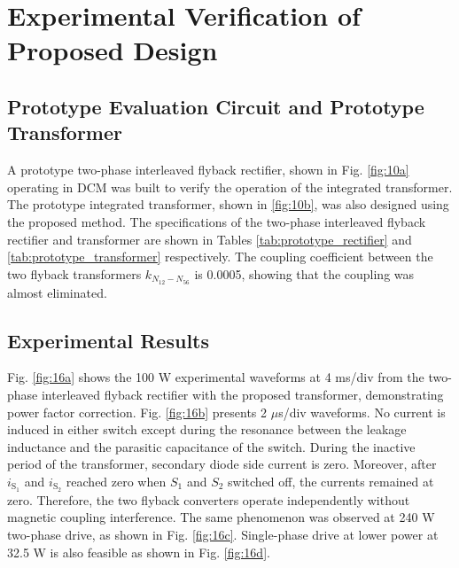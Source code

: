 \documentclass[lettersize,journal]{IEEEtran}
\begin{document}
\section{Experimental Verification of Proposed Design}

\subsection{Prototype Evaluation Circuit and Prototype Transformer}
A prototype two-phase interleaved flyback rectifier, shown in Fig. \ref{fig:10a} operating in DCM was built to verify the operation of the integrated transformer. The prototype integrated transformer, shown in \ref{fig:10b}, was also designed using the proposed method. The specifications of the two-phase interleaved flyback rectifier and transformer are shown in Tables \ref{tab:prototype_rectifier} and \ref{tab:prototype_transformer} respectively. The coupling coefficient between the two flyback transformers $k_{N_{12}-N_{56}}$ is 0.0005, showing that the coupling was almost eliminated.



\subsection{Experimental Results}
Fig. \ref{fig:16a} shows the 100 W experimental waveforms at 4 ms/div from the two-phase interleaved flyback rectifier with the proposed transformer, demonstrating power factor correction. Fig. \ref{fig:16b} presents 2 $\mu$s/div waveforms. No current is induced in either switch except during the resonance between the leakage inductance and the parasitic capacitance of the switch. During the inactive period of the transformer, secondary diode side current is zero. Moreover, after $i_{\mathrm{S}_1}$ and $i_{\mathrm{S}_2}$ reached zero when $S_1$ and $S_2$ switched off, the currents remained at zero. Therefore, the two flyback converters operate independently without magnetic coupling interference. The same phenomenon was observed at 240 W two-phase drive, as shown in Fig. \ref{fig:16c}. Single-phase drive at lower power at 32.5 W is also feasible as shown in Fig. \ref{fig:16d}.
\end{document}
